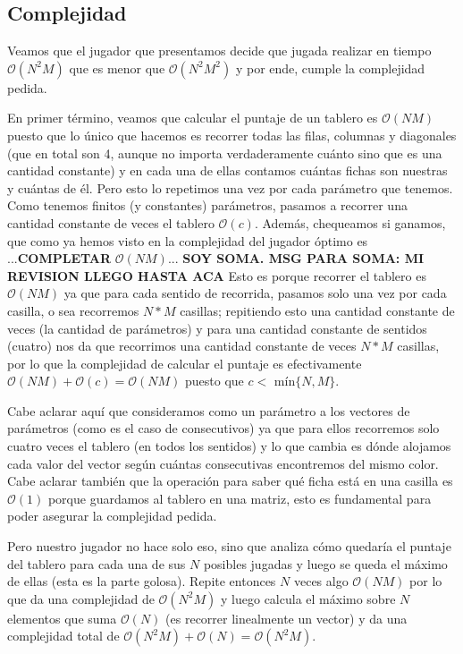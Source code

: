 \documentclass[A4paper,oneside,fleqn,11pt]{article}
\theoremstyle{definition}
\begin{document}
\subsection{Complejidad}

Veamos que el jugador que presentamos decide que jugada realizar en tiempo $\mathcal{O}(N^2 M)$ que es menor que $\mathcal{O}(N^2 M^2)$ y por ende, cumple la complejidad pedida. 





En primer término, veamos que calcular el puntaje de un tablero es $\mathcal{O}(NM)$ puesto que lo único que hacemos es recorrer todas las filas, columnas y diagonales (que en total son 4, aunque no importa verdaderamente cuánto sino que es una cantidad constante) y en cada una de ellas contamos cuántas fichas son nuestras y cuántas de él. Pero esto lo repetimos una vez por cada parámetro que tenemos. Como tenemos finitos (y constantes) parámetros, pasamos a recorrer una cantidad constante de veces el tablero $\mathcal{O}(c)$. Además, chequeamos si ganamos, que como ya hemos visto en la complejidad del jugador óptimo es ...\textbf{COMPLETAR} $\mathcal{O}(NM)$... \textbf{SOY SOMA. MSG PARA SOMA: MI REVISION LLEGO HASTA ACA} Esto es porque recorrer el tablero es $\mathcal{O}(NM)$ ya que para cada sentido de recorrida, pasamos solo una vez por cada casilla, o sea recorremos $N*M$ casillas; repitiendo esto una cantidad constante de veces (la cantidad de parámetros) y para una cantidad constante de sentidos (cuatro) nos da que recorrimos una cantidad constante de veces $N*M $ casillas, por lo que la complejidad de calcular el puntaje es efectivamente $\mathcal{O}(NM)+\mathcal{O}(c)=\mathcal{O}(NM)$ puesto que $c<$ mín$\{N,M\}$.

Cabe aclarar aquí que consideramos como un parámetro a los vectores de parámetros (como es el caso de consecutivos) ya que para ellos recorremos solo cuatro veces el tablero (en todos los sentidos) y lo que cambia es dónde alojamos cada valor del vector según cuántas consecutivas encontremos del mismo color. Cabe aclarar también que la operación para saber qué ficha está en una casilla es $\mathcal{O}(1)$ porque guardamos al tablero en una matriz, esto es fundamental para poder asegurar la complejidad pedida.

 
Pero nuestro jugador no hace solo eso, sino que analiza cómo quedaría el puntaje del tablero para cada una de sus $N$ posibles jugadas y luego se queda el máximo de ellas (esta es la parte golosa). Repite entonces $N$ veces algo  $\mathcal{O}(N M)$ por lo que da una complejidad de $\mathcal{O}(N^2 M)$ y luego calcula el máximo sobre $N$ elementos que suma $\mathcal{O}(N)$ (es recorrer linealmente un vector) y da una complejidad total de $\mathcal{O}(N^2 M) +\mathcal{O}(N) = \mathcal{O}(N^2 M)$.
\end{document}
